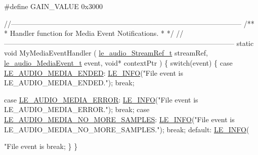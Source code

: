 \begin{DoxyCodeInclude}
\textcolor{preprocessor}{#define GAIN\_VALUE  0x3000}


\textcolor{comment}{//--------------------------------------------------------------------------------------------------}\textcolor{comment}{}
\textcolor{comment}{/**}
\textcolor{comment}{ * Handler function for Media Event Notifications.}
\textcolor{comment}{ *}
\textcolor{comment}{ */}
\textcolor{comment}{//--------------------------------------------------------------------------------------------------}
\textcolor{keyword}{static} \textcolor{keywordtype}{void} MyMediaEventHandler
(
    \hyperlink{le__audio__interface_8h_a9a46ff5a5afa61f1bc76120ab9e4da0a}{le\_audio\_StreamRef\_t}          streamRef,
    \hyperlink{le__audio__interface_8h_aaf870f5f30f4f6f65efb873c5d0cb5f1}{le\_audio\_MediaEvent\_t}          event,
    \textcolor{keywordtype}{void}*                         contextPtr
)
\{
    \textcolor{keywordflow}{switch}(event)
    \{
        \textcolor{keywordflow}{case} \hyperlink{le__audio__interface_8h_aaf870f5f30f4f6f65efb873c5d0cb5f1a7dbc0c9a2c3839d3db974c5aa5be344d}{LE\_AUDIO\_MEDIA\_ENDED}:
            \hyperlink{le__log_8h_a23e6d206faa64f612045d688cdde5808}{LE\_INFO}(\textcolor{stringliteral}{"File event is LE\_AUDIO\_MEDIA\_ENDED."});
            \textcolor{keywordflow}{break};

        \textcolor{keywordflow}{case} \hyperlink{le__audio__interface_8h_aaf870f5f30f4f6f65efb873c5d0cb5f1a5f7de6714ea54f09d036a87dd1c63a50}{LE\_AUDIO\_MEDIA\_ERROR}:
            \hyperlink{le__log_8h_a23e6d206faa64f612045d688cdde5808}{LE\_INFO}(\textcolor{stringliteral}{"File event is LE\_AUDIO\_MEDIA\_ERROR."});
            \textcolor{keywordflow}{break};
        \textcolor{keywordflow}{case} \hyperlink{le__audio__interface_8h_aaf870f5f30f4f6f65efb873c5d0cb5f1a06883432159e9e69637fbe5eefd59159}{LE\_AUDIO\_MEDIA\_NO\_MORE\_SAMPLES}:
            \hyperlink{le__log_8h_a23e6d206faa64f612045d688cdde5808}{LE\_INFO}(\textcolor{stringliteral}{"File event is LE\_AUDIO\_MEDIA\_NO\_MORE\_SAMPLES."});
            \textcolor{keywordflow}{break};
        \textcolor{keywordflow}{default}:
            \hyperlink{le__log_8h_a23e6d206faa64f612045d688cdde5808}{LE\_INFO}(\textcolor{stringliteral}{"File event is %
            \textcolor{keywordflow}{break};
    \}
\}


}
\end{DoxyCodeInclude}
